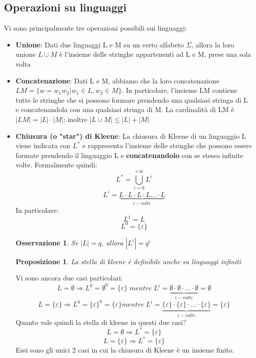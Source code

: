 \documentclass[12pt]{article}
\newtheorem{Proposizione}{Proposizione}[subsection]
\newtheorem{Osservazione}{Osservazione}[subsection]
\begin{document}
\subsection{Operazioni su linguaggi}
Vi sono principalmente tre operazioni possibili sui linguaggi:
\begin{itemize}
    \item \textbf{Unione}: Dati due linguaggi L e M su un certo alfabeto $\Sigma$, allora la loro unione $L \cup M$ è l'insieme delle stringhe appartenenti ad L e M, prese una sola volta
    \item \textbf{Concatenazione}: Dati L e M, abbiamo che la loro concatenazione $LM = \{w=w_1w_2|w_1 \in L, w_2 \in M\}$. In particolare, l'insieme LM contiene tutte le stringhe che si possono formare prendendo una qualsiasi stringa di L e concatenandola con una qualsiasi stringa di M. La cardinalità di LM è $|LM| = |L| \cdot |M|$; inoltre $|L \cup M| \leq |L| + |M|$
    \item \textbf{Chiusura (o "star") di Kleene}: La chiusura di Kleene di un linguaggio L viene indicata con $L^*$ e rappresenta l'insieme delle stringhe che possono essere formate prendendo il linguaggio L e \textbf{concatenandolo} con se stesso infinite volte. Formalmente quindi:
    $$L^* = \bigcup_{i=0}^{+\infty}L^i$$
    $$L^i = \underbrace{L \cdot L \cdot L \cdot L ... \cdot L}_{i-volte}$$
    In particolare: $$L^1 = L$$ $$L^0 = \{\varepsilon\}$$
    \begin{Osservazione}
        Se $|L| = q$, allora $|L^i| = q^i$
    \end{Osservazione}
    \begin{Proposizione}
        La stella di kleene è definibile anche su linguaggi infiniti
    \end{Proposizione}
    Vi sono ancora due casi particolari:
    $$L = \emptyset \Rightarrow L^0 = \emptyset^0 = \{\varepsilon\} \; mentre \; L^i = \underbrace{\emptyset \cdot \emptyset \cdot ... \cdot \emptyset}_{i-volte} = \emptyset$$
    $$L = \{\varepsilon\} \Rightarrow L^0 = \{\varepsilon\}^0 = \{\varepsilon\} mentre \; L^i = \underbrace{\{\varepsilon\} \cdot \{\varepsilon\} \cdot ... \cdot \{\varepsilon\}}_{i-volte} = \{\varepsilon\}$$
    Quanto vale quindi la stella di kleene in questi due casi?
    $$L = \emptyset \Rightarrow L^* = \{\varepsilon\}$$
    $$L = \{\varepsilon\} \Rightarrow L^* = \{\varepsilon\}$$
    Essi sono gli unici 2 casi in cui la chiusura di Kleene è un insieme finito.
\end{itemize}
\end{document}

